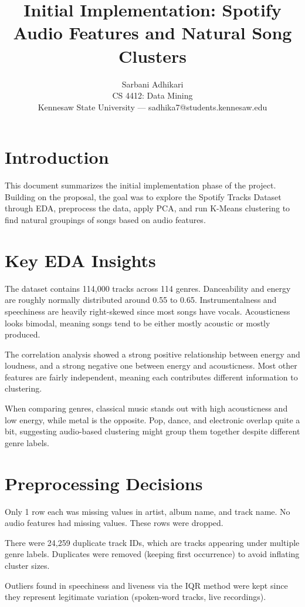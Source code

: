 \documentclass[10pt,twocolumn]{article}
\title{\Large\bfseries Initial Implementation: Spotify Audio Features and Natural Song Clusters}
\author{Sarbani Adhikari\\
\small CS 4412: Data Mining\\
\small Kennesaw State University --- sadhika7@students.kennesaw.edu}
\date{}
\begin{document}
\maketitle

\section{Introduction}

This document summarizes the initial implementation phase of the project. Building on the proposal, the goal was to explore the Spotify Tracks Dataset through EDA, preprocess the data, apply PCA, and run K-Means clustering to find natural groupings of songs based on audio features.

\section{Key EDA Insights}

The dataset contains 114,000 tracks across 114 genres. Danceability and energy are roughly normally distributed around 0.55 to 0.65. Instrumentalness and speechiness are heavily right-skewed since most songs have vocals. Acousticness looks bimodal, meaning songs tend to be either mostly acoustic or mostly produced.

The correlation analysis showed a strong positive relationship between energy and loudness, and a strong negative one between energy and acousticness. Most other features are fairly independent, meaning each contributes different information to clustering.

When comparing genres, classical music stands out with high acousticness and low energy, while metal is the opposite. Pop, dance, and electronic overlap quite a bit, suggesting audio-based clustering might group them together despite different genre labels.

\section{Preprocessing Decisions}

Only 1 row each was missing values in artist, album name, and track name. No audio features had missing values. These rows were dropped.

There were 24,259 duplicate track IDs, which are tracks appearing under multiple genre labels. Duplicates were removed (keeping first occurrence) to avoid inflating cluster sizes.

Outliers found in speechiness and liveness via the IQR method were kept since they represent legitimate variation (spoken-word tracks, live recordings).
\end{document}
